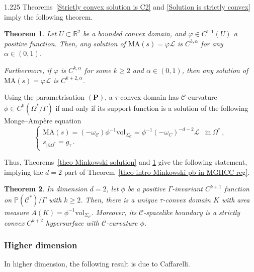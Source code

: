 \documentclass[reqno, a4paper]{amsart}
\numberwithin{equation}{section}
\numberwithin{figure}{section}
\newtheorem{theorem}{Theorem}[section]
\theoremstyle{definition}
\theoremstyle{remark}
\newcommand{\R}{\mathbb{R}} %
\renewcommand{\P}{\mathbb{P}} %
\newcommand{\C}{\mathcal{C}} %
\renewcommand{\S}{\Sigma_\C} %
\newcommand{\vol}{\mathrm{vol}} %
\newcommand{\MA}{\mathrm{MA}} %
\begin{document}
\begin{spacing}{1.225}
Theorems~\ref{Strictly convex solution is C2} and \ref{Solution is strictly convex} imply the following theorem. 

\begin{theorem}
\label{theo C2+ regularity}
Let $U \subset \R^2$ be a bounded convex domain, and $\varphi \in C^{1,1}(U)$ a positive function. Then, any solution of $\MA(s) = \varphi \mathcal{L}$ is $ C^{3,\alpha}$ for any $\alpha \in (0,1)$.

Furthermore, if $\varphi$ is $C^{k,\alpha}$ for some $k\geq2$ and $\alpha \in (0,1)$, then any solution of $\MA(s) = \varphi \mathcal{L}$ is $ C^{k+2,\alpha}$. 
\end{theorem}

Using the parametrisation $(\mathbf{P})$, a $\tau$-convex domain has $\C$-curvature $\phi \in C^0(\Omega^*/\Gamma)$ if and only if its support function is a solution of the following Monge--Amp\`ere equation
\begin{equation*}
\begin{cases}
\MA(s) = (-\omega_\C) \phi^{-1}\vol_{\S} = \phi^{-1} (-\omega_C)^{-d-2} \mathcal{L} & \text{in} \ \Omega^* \, ,\\
s_{\vert \partial \Omega^*} = g_\tau \, . 
\end{cases}
\end{equation*}

Thus, Theorems~\ref{theo Minkowski solution} and \ref{theo C2+ regularity} give the following statement, implying the $d=2$ part of Theorem~\ref{theo intro Minkowski pb in MGHCC reg}. 

\begin{theorem}
In dimension $d=2$, let $\phi$ be a positive $\Gamma$-invariant $C^{k+1}$ function on $\P(\C^*)/\Gamma$ with $k\geq 2$. Then, there is a unique $\tau$-convex domain $K$ with area measure $A(K) = \phi^{-1} \vol_{\S}$. Moreover, its $\C$-spacelike boundary is a strictly convex $C^{k+2}$ hypersurface with $\C$-curvature $\phi$. 
\end{theorem}

\subsubsection{Higher dimension}

In higher dimension, the following result is due to Caffarelli. 


\end{spacing}
\end{document}
